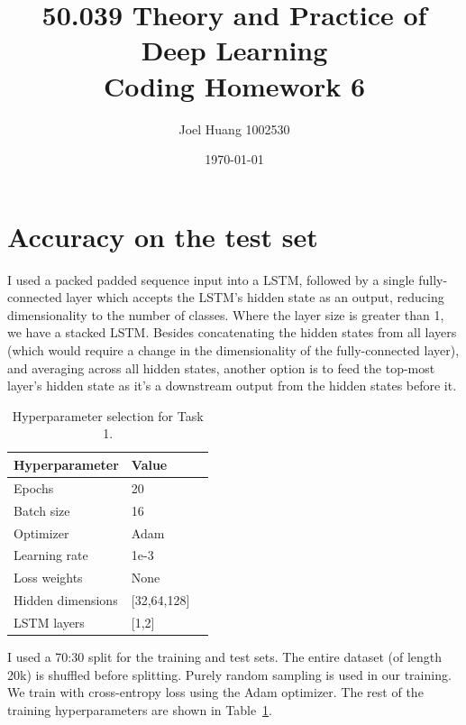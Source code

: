 \documentclass[twocolumn, 9pt]{article}
\title{
	50.039 Theory and Practice of Deep Learning\\
	Coding Homework 6
}
\author{Joel Huang 1002530}
\date{\today}
\begin{document}
\maketitle

\section{Accuracy on the test set}
I used a packed padded sequence input into a LSTM, followed by
a single fully-connected layer which accepts the LSTM's hidden
state as an output, reducing dimensionality to the number of classes.
Where the layer size is greater than 1, we have a stacked LSTM. Besides
concatenating the hidden states from all layers (which would require a
change in the dimensionality of the fully-connected layer), and averaging
across all hidden states, another option is to feed the top-most layer's
hidden state as it's a downstream output from the hidden states before it.

\begin{table}[h]
  \centering
  \begin{tabular}{lll}
    \toprule
    Hyperparameter    & Value  \\
    \midrule
    Epochs            & 20     \\
    Batch size        & 16     \\
    Optimizer         & Adam   \\
    Learning rate     & 1e-3   \\
    Loss weights      & None   \\
    Hidden dimensions & [32,64,128]\\
    LSTM layers       & [1,2]  \\
    \bottomrule
  \end{tabular}
  \caption{Hyperparameter selection for Task 1.}
  \label{tab:hyp1}
\end{table}

I used a 70:30 split for the training and test sets. The entire dataset
(of length 20k) is shuffled before splitting. Purely random sampling is
used in our training. We train with cross-entropy loss using the Adam
optimizer. The rest of the training hyperparameters are shown in
Table~\ref{tab:hyp1}.
\end{document}
